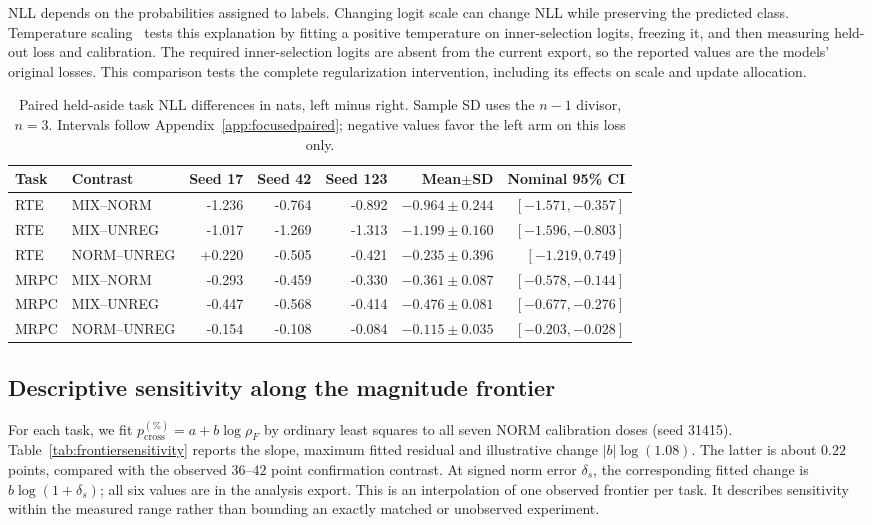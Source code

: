\documentclass{article}
\newcommand{\cross}{\mathrm{cross}}
\begin{document}
NLL depends on the probabilities assigned to labels. Changing logit scale can change NLL while preserving the predicted class. Temperature scaling~\citep{guo2017calibration} tests this explanation by fitting a positive temperature on inner-selection logits, freezing it, and then measuring held-out loss and calibration. The required inner-selection logits are absent from the current export, so the reported values are the models' original losses. This comparison tests the complete regularization intervention, including its effects on scale and update allocation.

\begin{table}[t]
\centering
\caption{Paired held-aside task NLL differences in nats, left minus right. Sample SD uses the $n-1$ divisor, $n=3$. Intervals follow Appendix~\ref{app:focusedpaired}; negative values favor the left arm on this loss only.}
\label{tab:heldlosspaired}
\begin{adjustbox}{max width=\linewidth}
\begin{tabular}{llrrrrr}
\toprule
Task & Contrast & Seed 17 & Seed 42 & Seed 123 & Mean$\pm$SD & Nominal 95\% CI\\
\midrule
RTE & MIX--NORM & -1.236 & -0.764 & -0.892 & $-0.964 \pm 0.244$ & $[-1.571,-0.357]$ \\
RTE & MIX--UNREG & -1.017 & -1.269 & -1.313 & $-1.199 \pm 0.160$ & $[-1.596,-0.803]$ \\
RTE & NORM--UNREG & +0.220 & -0.505 & -0.421 & $-0.235 \pm 0.396$ & $[-1.219,0.749]$ \\
MRPC & MIX--NORM & -0.293 & -0.459 & -0.330 & $-0.361 \pm 0.087$ & $[-0.578,-0.144]$ \\
MRPC & MIX--UNREG & -0.447 & -0.568 & -0.414 & $-0.476 \pm 0.081$ & $[-0.677,-0.276]$ \\
MRPC & NORM--UNREG & -0.154 & -0.108 & -0.084 & $-0.115 \pm 0.035$ & $[-0.203,-0.028]$ \\
\bottomrule
\end{tabular}
\end{adjustbox}
\end{table}

\subsection{Descriptive sensitivity along the magnitude frontier}
\label{app:frontiersensitivity}
For each task, we fit $p_\cross^{(\%)}=a+b\log\rho_F$ by ordinary least squares to all seven NORM calibration doses (seed 31415). Table~\ref{tab:frontiersensitivity} reports the slope, maximum fitted residual and illustrative change $|b|\log(1.08)$. The latter is about $0.22$ points, compared with the observed $36$--$42$ point confirmation contrast. At signed norm error $\delta_s$, the corresponding fitted change is $b\log(1+\delta_s)$; all six values are in the analysis export. This is an interpolation of one observed frontier per task. It describes sensitivity within the measured range rather than bounding an exactly matched or unobserved experiment.
\end{document}
